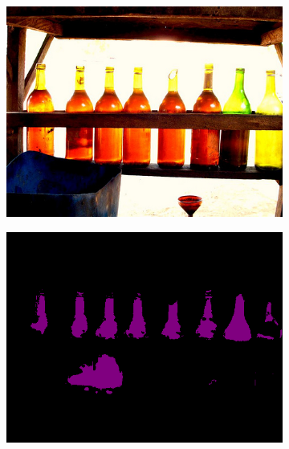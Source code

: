 \documentclass{article} %
\begin{document}
\begin{figure}[b]
  \centering
  \begin{subfigure}[b]{0.15\linewidth}
    \includegraphics[width=\textwidth]{figs/ab/img/2009_005302}
  \end{subfigure}
  \begin{subfigure}[b]{0.15\linewidth}
    \includegraphics[width=\textwidth]{figs/ab/crf/2009_005302}
  \end{subfigure}
  \begin{subfigure}[b]{0.15\linewidth}

\end{subfigure}
\end{figure}
\end{document}
